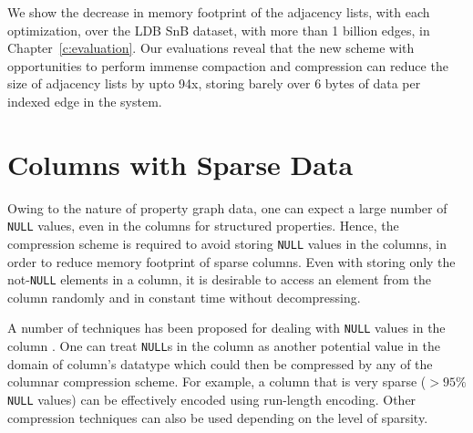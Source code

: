 
We show the decrease in memory footprint of the adjacency lists, with each optimization, over the LDB SnB dataset, with more than 1 billion edges, in Chapter~\ref{c:evaluation}. Our evaluations reveal that the new scheme with opportunities to perform immense compaction and compression can reduce the size of adjacency lists by upto 94x, storing barely over 6 bytes of data per indexed edge in the system.

\section{Columns with Sparse Data}
\label{sec:sparse}

Owing to the nature of property graph data, one can expect a large number of \texttt{NULL} values, even in the columns for structured properties. Hence, the compression scheme is required to avoid storing \texttt{NULL} values in the columns, in order to reduce memory footprint of sparse columns. Even with storing only the not-\texttt{NULL} elements in a column, it is desirable to access an element from the column randomly and in constant time without decompressing. 

A number of techniques has been proposed for dealing with \texttt{NULL} values in the column \cite{abadi-sparse-col}. One can treat \texttt{NULL}s in the column as another potential value in the domain of column's datatype which could then be compressed by any of the columnar compression scheme. For example, a column that is very sparse ($>95\%$ \texttt{NULL} values) can be effectively encoded using run-length encoding. Other compression techniques can also be used depending on the level of sparsity.

